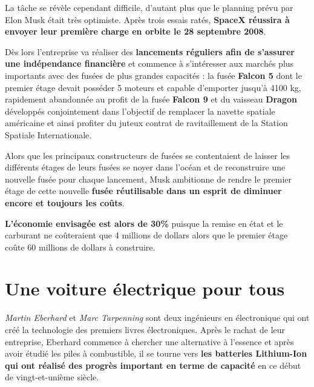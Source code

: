 \vspace{5mm}

La tâche se révèle cependant difficile, d'autant plus que le planning prévu par Elon Musk était très optimiste. Après trois essais ratés, \textbf{SpaceX réussira à envoyer leur première charge en orbite le 28 septembre 2008}.

\vspace{5mm}

Dès lors l'entreprise va réaliser des \textbf{lancements réguliers afin de s'assurer une indépendance financière} et commence à s'intéresser aux marchés plus importants avec des fusées de plus grandes capacités : la fusée \textbf{Falcon 5} dont le premier étage devait posséder 5 moteurs et capable d'emporter jusqu'à 4100 kg, rapidement abandonnée au profit de la fusée \textbf{Falcon 9} et du vaisseau \textbf{Dragon} développés conjointement dans l'objectif de remplacer la navette spatiale américaine et ainsi profiter du juteux contrat de ravitaillement de la Station Spatiale Internationale.

\vspace{5mm}

Alors que les principaux constructeurs de fusées se contentaient de laisser les différents étages de leurs fusées se noyer dans l'océan et de reconstruire une nouvelle fusée pour chaque lancement, Musk ambitionne de rendre le premier étage de cette nouvelle \textbf{fusée réutilisable dans un esprit de diminuer encore et toujours les coûts}\supercite{MuskAmbitionReusableFalcon9}.

\textbf{L'économie envisagée est alors de 30\%} puisque la remise en état et le carburant ne coûteraient que 4 millions de dollars alors que le premier étage coûte 60 millions de dollars à construire\supercite{SpaceXReusable30Percent}.

\section{Une voiture électrique pour tous}

\textit{Martin Eberhard} et \textit{Marc Tarpenning} sont deux ingénieurs en électronique qui ont créé la technologie des premiers livres électroniques. Après le rachat de leur entreprise, Eberhard commence à chercher une alternative à l'essence et après avoir étudié les piles à combustible, il se tourne vers \textbf{les batteries Lithium-Ion qui ont réalisé des progrès important en terme de capacité} en ce début de vingt-et-unième siècle.

